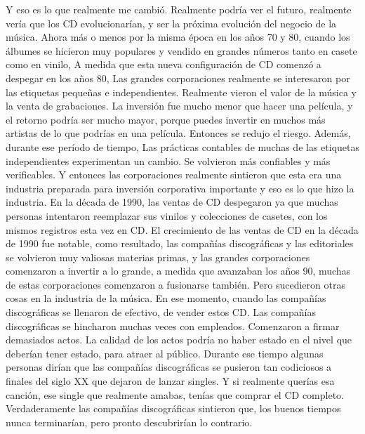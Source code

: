 \documentclass[10pt]{book}
\begin{document}
Y eso es lo que realmente me cambió. Realmente podría ver el futuro, realmente vería que los CD evolucionarían, y ser la próxima evolución del negocio de la música. Ahora más o menos por la misma época en los años 70 y 80, cuando los álbumes se hicieron muy populares y vendido en grandes números tanto en casete como en vinilo, A medida que esta nueva configuración de CD comenzó a despegar en los años 80, Las grandes corporaciones realmente se interesaron por las etiquetas pequeñas e independientes. Realmente vieron el valor de la música y la venta de grabaciones. La inversión fue mucho menor que hacer una película, y el retorno podría ser mucho mayor, porque puedes invertir en muchos más artistas de lo que podrías en una película. Entonces se redujo el riesgo. Además, durante ese período de tiempo, Las prácticas contables de muchas de las etiquetas independientes experimentan un cambio. Se volvieron más confiables y más verificables. Y entonces las corporaciones realmente sintieron que esta era una industria preparada para inversión corporativa importante y eso es lo que hizo la industria. En la década de 1990, las ventas de CD despegaron ya que muchas personas intentaron reemplazar sus vinilos y colecciones de casetes, con los mismos registros esta vez en CD. El crecimiento de las ventas de CD en la década de 1990 fue notable, como resultado, las compañías discográficas y las editoriales se volvieron muy valiosas materias primas, y las grandes corporaciones comenzaron a invertir a lo grande, a medida que avanzaban los años 90, muchas de estas corporaciones comenzaron a fusionarse también. Pero sucedieron otras cosas en la industria de la música. En ese momento, cuando las compañías discográficas se llenaron de efectivo, de vender estos CD. Las compañías discográficas se hincharon muchas veces con empleados. Comenzaron a firmar demasiados actos. La calidad de los actos podría no haber estado en el nivel que deberían tener estado, para atraer al público. Durante ese tiempo algunas personas dirían que las compañías discográficas se pusieron tan codiciosos a finales del siglo XX que dejaron de lanzar singles. Y si realmente querías esa canción, ese single que realmente amabas, tenías que comprar el CD completo. Verdaderamente las compañías discográficas sintieron que, los buenos tiempos nunca terminarían, pero pronto descubrirían lo contrario.
\end{document}
